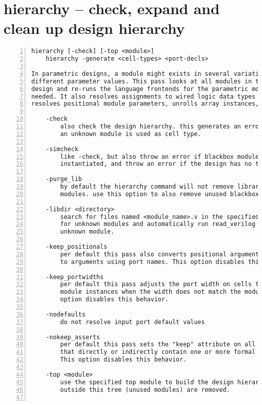 \section{hierarchy -- check, expand and clean up design hierarchy}
\label{cmd:hierarchy}
\begin{lstlisting}[numbers=left,frame=single]
    hierarchy [-check] [-top <module>]
    hierarchy -generate <cell-types> <port-decls>

In parametric designs, a module might exists in several variations with
different parameter values. This pass looks at all modules in the current
design and re-runs the language frontends for the parametric modules as
needed. It also resolves assignments to wired logic data types (wand/wor),
resolves positional module parameters, unrolls array instances, and more.

    -check
        also check the design hierarchy. this generates an error when
        an unknown module is used as cell type.

    -simcheck
        like -check, but also throw an error if blackbox modules are
        instantiated, and throw an error if the design has no top module.

    -purge_lib
        by default the hierarchy command will not remove library (blackbox)
        modules. use this option to also remove unused blackbox modules.

    -libdir <directory>
        search for files named <module_name>.v in the specified directory
        for unknown modules and automatically run read_verilog for each
        unknown module.

    -keep_positionals
        per default this pass also converts positional arguments in cells
        to arguments using port names. This option disables this behavior.

    -keep_portwidths
        per default this pass adjusts the port width on cells that are
        module instances when the width does not match the module port. This
        option disables this behavior.

    -nodefaults
        do not resolve input port default values

    -nokeep_asserts
        per default this pass sets the "keep" attribute on all modules
        that directly or indirectly contain one or more formal properties.
        This option disables this behavior.

    -top <module>
        use the specified top module to build the design hierarchy. Modules
        outside this tree (unused modules) are removed.


\end{lstlisting}
